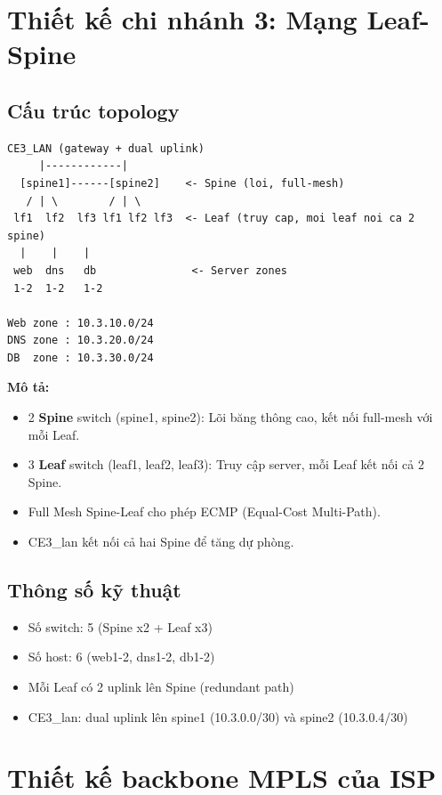 \section{Thiết kế chi nhánh 3: Mạng Leaf-Spine}

\subsection{Cấu trúc topology}

\begin{Verbatim}[fontsize=\small, frame=single]
    CE3_LAN (gateway + dual uplink)
     |------------|
  [spine1]------[spine2]    <- Spine (loi, full-mesh)
   / | \        / | \
 lf1  lf2  lf3 lf1 lf2 lf3  <- Leaf (truy cap, moi leaf noi ca 2 spine)
  |    |    |
 web  dns   db               <- Server zones
 1-2  1-2   1-2

Web zone : 10.3.10.0/24
DNS zone : 10.3.20.0/24
DB  zone : 10.3.30.0/24
\end{Verbatim}

\textbf{Mô tả:}
\begin{itemize}
    \item 2 \textbf{Spine} switch (spine1, spine2): Lõi băng thông cao, kết nối full-mesh với mỗi Leaf.
    \item 3 \textbf{Leaf} switch (leaf1, leaf2, leaf3): Truy cập server, mỗi Leaf kết nối cả 2 Spine.
    \item Full Mesh Spine-Leaf cho phép ECMP (Equal-Cost Multi-Path).
    \item CE3\_lan kết nối cả hai Spine để tăng dự phòng.
\end{itemize}

\subsection{Thông số kỹ thuật}
\begin{itemize}
    \item Số switch: 5 (Spine x2 + Leaf x3)
    \item Số host: 6 (web1-2, dns1-2, db1-2)
    \item Mỗi Leaf có 2 uplink lên Spine (redundant path)
    \item CE3\_lan: dual uplink lên spine1 (10.3.0.0/30) và spine2 (10.3.0.4/30)
\end{itemize}

\section{Thiết kế backbone MPLS của ISP}


